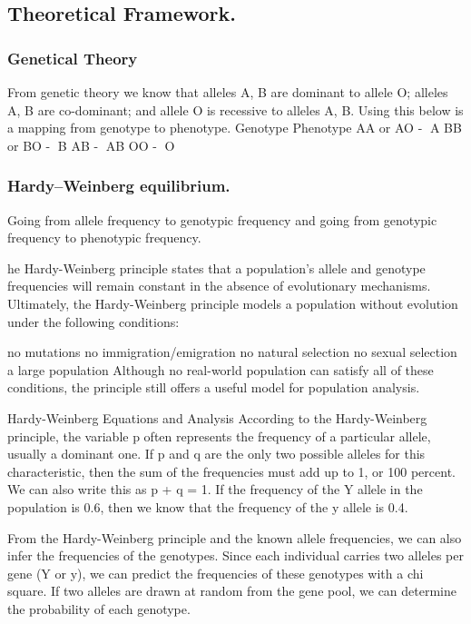 \documentclass[]{article}
\begin{document}
\subsection{Theoretical Framework.}\label{theoretical-framework.}

\subsubsection{Genetical Theory}\label{genetical-theory}

From genetic theory we know that alleles A, B are dominant to allele O;
alleles A, B are co-dominant; and allele O is recessive to alleles A, B.
Using this below is a mapping from genotype to phenotype. Genotype
Phenotype AA or AO - A BB or BO - B AB - AB OO - O

\subsubsection{Hardy--Weinberg
equilibrium.}\label{hardyweinberg-equilibrium.}

Going from allele frequency to genotypic frequency and going from
genotypic frequency to phenotypic frequency.

he Hardy-Weinberg principle states that a population's allele and
genotype frequencies will remain constant in the absence of evolutionary
mechanisms. Ultimately, the Hardy-Weinberg principle models a population
without evolution under the following conditions:

no mutations no immigration/emigration no natural selection no sexual
selection a large population Although no real-world population can
satisfy all of these conditions, the principle still offers a useful
model for population analysis.

Hardy-Weinberg Equations and Analysis According to the Hardy-Weinberg
principle, the variable p often represents the frequency of a particular
allele, usually a dominant one. If p and q are the only two possible
alleles for this characteristic, then the sum of the frequencies must
add up to 1, or 100 percent. We can also write this as p + q = 1. If the
frequency of the Y allele in the population is 0.6, then we know that
the frequency of the y allele is 0.4.

From the Hardy-Weinberg principle and the known allele frequencies, we
can also infer the frequencies of the genotypes. Since each individual
carries two alleles per gene (Y or y), we can predict the frequencies of
these genotypes with a chi square. If two alleles are drawn at random
from the gene pool, we can determine the probability of each genotype.
\end{document}
